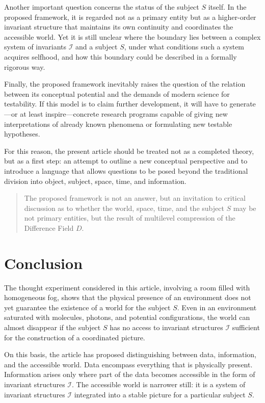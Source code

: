 \documentclass[aps,prd,onecolumn,nofootinbib,superscriptaddress]{revtex4-2} %
\begin{document}
    Another important question concerns the status of the subject \(S\) itself. In the proposed framework, it is regarded not as a primary entity but as a higher-order invariant structure that maintains its own continuity and coordinates the accessible world. Yet it is still unclear where the boundary lies between a complex system of invariants \(\mathcal{I}\) and a subject \(S\), under what conditions such a system acquires selfhood, and how this boundary could be described in a formally rigorous way.

    Finally, the proposed framework inevitably raises the question of the relation between its conceptual potential and the demands of modern science for testability. If this model is to claim further development, it will have to generate—or at least inspire—concrete research programs capable of giving new interpretations of already known phenomena or formulating new testable hypotheses.

    For this reason, the present article should be treated not as a completed theory, but as a first step: an attempt to outline a new conceptual perspective and to introduce a language that allows questions to be posed beyond the traditional division into object, subject, space, time, and information.

    \begin{quote}
        The proposed framework is not an answer, but an invitation to critical discussion as to whether the world, space, time, and the subject \(S\) may be not primary entities, but the result of multilevel compression of the Difference Field \(D\).
    \end{quote}


    \section{Conclusion}

    The thought experiment considered in this article, involving a room filled with homogeneous fog, shows that the physical presence of an environment does not yet guarantee the existence of a world for the subject \(S\). Even in an environment saturated with molecules, photons, and potential configurations, the world can almost disappear if the subject \(S\) has no access to invariant structures \(\mathcal{I}\) sufficient for the construction of a coordinated picture.

    On this basis, the article has proposed distinguishing between data, information, and the accessible world. Data encompass everything that is physically present. Information arises only where part of the data becomes accessible in the form of invariant structures \(\mathcal{I}\). The accessible world is narrower still: it is a system of invariant structures \(\mathcal{I}\) integrated into a stable picture for a particular subject \(S\).
\end{document}

